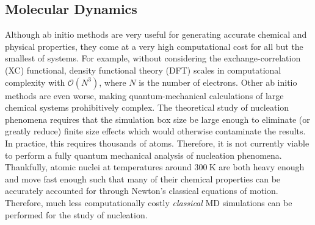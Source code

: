 \documentclass[titlepage,11pt]{article}
\begin{document}
\subsection{Molecular Dynamics}

Although ab initio methods are very useful for generating accurate chemical and physical properties, they come at a very high computational cost for all but the smallest of systems. For example, without considering the exchange-correlation (XC) functional, density functional theory (DFT) scales in computational complexity with $\mathcal{O}(N^3)$, where $N$ is the number of electrons. Other ab initio methods are even worse, making quantum-mechanical calculations of large chemical systems prohibitively complex. The theoretical study of nucleation phenomena requires that the simulation box size be large enough to eliminate (or greatly reduce) finite size effects which would otherwise contaminate the results. In practice, this requires thousands of atoms. Therefore, it is not currently viable to perform a fully quantum mechanical analysis of nucleation phenomena. Thankfully, atomic nuclei at temperatures around $\SI{300}{\kelvin}$ are both heavy enough and move fast enough such that many of their chemical properties can be accurately accounted for through Newton's classical equations of motion. Therefore, much less computationally costly \textit{classical} MD simulations can be performed for the study of nucleation.
\end{document}
